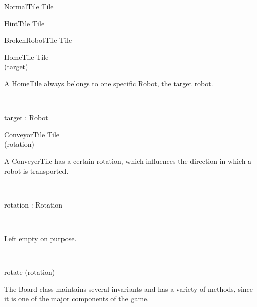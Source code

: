\begin{class}{NormalTile}
Tile
\end{class}

\begin{class}{HintTile}
Tile
\end{class}

\begin{class}{BrokenRobotTile}
Tile
\end{class}

\begin{class}{HomeTile}
Tile \\
\upharpoonright (target) \\
\begin{classcom}
A HomeTile always belongs to one specific Robot, the target robot.
\end{classcom} \\
\begin{state}
target : Robot
\end{state}
\end{class}

\begin{class}{ConveyorTile}
Tile \\
\upharpoonright (rotation) \\
\begin{classcom}
A ConveyerTile has a certain rotation, which influences the direction in which a robot is transported.
\end{classcom} \\
\begin{state}
rotation : Rotation
\end{state} \\
\begin{classcom}
Left empty on purpose.
\end{classcom} \\
\begin{schema}{rotate}
\Delta (rotation)
\end{schema}
\end{class}

The Board class maintains several invariants and has a variety of methods, since it is one of the major components of the game.

